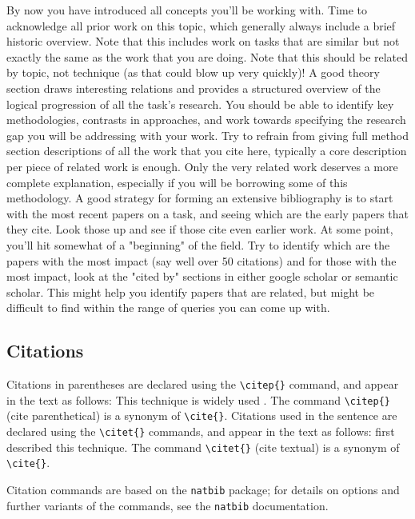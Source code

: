 By now you have introduced all concepts you'll be working with. Time to acknowledge all prior work on this topic, which generally always include a brief historic overview. Note that this includes work on tasks that are similar but not exactly the same as the work that you are doing. Note that this should be related by topic, not technique (as that could blow up very quickly)! A good theory section draws interesting relations and provides a structured overview of the logical progression of all the task's research. You should be able to identify key methodologies, contrasts in approaches, and work towards specifying the research gap you will be addressing with your work. Try to refrain from giving full method section descriptions of all the work that you cite here, typically a core description per piece of related work is enough. Only the very related work deserves a more complete explanation, especially if you will be borrowing some of this methodology. A good strategy for forming an extensive bibliography is to start with the most recent papers on a task, and seeing which are the early papers that they cite. Look those up and see if those cite even earlier work. At some point, you'll hit somewhat of a "beginning" of the field. Try to identify which are the papers with the most impact (say well over 50 citations) and for those with the most impact, look at the "cited by" sections in either google scholar or semantic scholar. This might help you identify papers that are related, but might be difficult to find within the range of queries you can come up with.

\subsection{Citations} \label{subsec:citations}

Citations in parentheses are declared using the \verb|\citep{}| command, and appear in the text as follows: This technique is widely used \citep{woods1970}. The command \verb|\citep{}| (cite parenthetical) is a synonym of \verb|\cite{}|. Citations used in the sentence are declared using the \verb|\citet{}| commands, and appear in the text as follows: \citet{woods1970} first described this technique. The command \verb|\citet{}| (cite textual) is a synonym of \verb|\cite{}|.

Citation commands are based on the \verb|natbib| package; for details on options and further variants of the commands, see the \verb|natbib| documentation.
